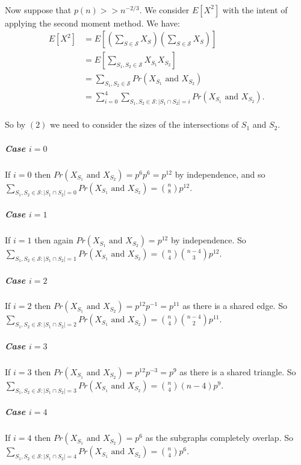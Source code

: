 \documentclass[letterpaper,12pt,oneside,onecolumn]{report}
\begin{document}
\paragraph{}
Now suppose that $p(n) >> n^{-2/3}$. We consider $E[X^2]$ with the intent of applying the second moment method. We have:
\begin{align}
E[X^2] &= E[(\sum_{S\in \mathcal{S}} X_S)(\sum_{S \in \mathcal{S}} X_S)] \nonumber\\
&= E[\sum_{S_1,S_2 \in \mathcal{S}} X_{S_1}X_{S_2}] \nonumber\\
&= \sum_{S_1,S_2 \in \mathcal{S}} Pr(X_{S_1} \text{ and } X_{S_2}) \nonumber\\
&= \sum_{i = 0}^4 \sum_{S_1,S_2 \in \mathcal{S} : |S_1 \cap S_2| = i} Pr(X_{S_1} \text{ and } X_{S_2}).
\end{align}
\paragraph{}
So by $(2)$ we need to consider the sizes of the intersections of $S_1$ and $S_2$.
\subparagraph{Case $i = 0$}
If $i = 0$ then $Pr(X_{S_1} \text{ and } X_{S_2}) = p^6p^6 = p^{12}$ by independence, and so $\sum_{S_1,S_2 \in \mathcal{S} : |S_1 \cap S_2| = 0} Pr(X_{S_1} \text{ and } X_{S_2}) = {n \choose 8}p^{12}$.
\subparagraph{Case $i=1$}
If $i=1$ then again $Pr(X_{S_1} \text{ and } X_{S_2}) = p^{12}$ by independence. So $\sum_{S_1,S_2 \in \mathcal{S} : |S_1 \cap S_2| = 1} Pr(X_{S_1} \text{ and } X_{S_2}) = {n \choose 4}{n-4 \choose 3}p^{12}$.
\subparagraph{Case $i=2$}
If $i=2$ then $Pr(X_{S_1} \text{ and } X_{S_2}) = p^{12} p^{-1} = p^{11}$ as there is a shared edge. So $\sum_{S_1,S_2 \in \mathcal{S} : |S_1 \cap S_2| = 2} Pr(X_{S_1} \text{ and } X_{S_2}) = {n \choose 4}{n-4 \choose 2}p^{11}$.
\subparagraph{Case $i=3$}
If $i=3$ then $Pr(X_{S_1} \text{ and } X_{S_2}) = p^{12} p^{-3} = p^{9}$ as there is a shared triangle. So $\sum_{S_1,S_2 \in \mathcal{S} : |S_1 \cap S_2| = 3} Pr(X_{S_1} \text{ and } X_{S_2}) = {n \choose 4}(n-4)p^{9}$.
\subparagraph{Case $i=4$}
If $i=4$ then $Pr(X_{S_1} \text{ and } X_{S_2}) = p^6$ as the subgraphs completely overlap. So $\sum_{S_1,S_2 \in \mathcal{S} : |S_1 \cap S_2| = 4} Pr(X_{S_1} \text{ and } X_{S_2}) = {n \choose 4}p^{6}$.
\end{document}
